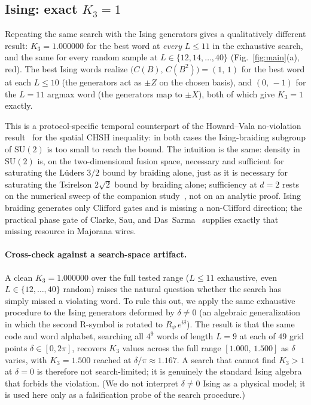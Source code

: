 \documentclass[aps,prx,reprint,amsmath,amssymb,floatfix,nofootinbib,superscriptaddress]{revtex4-2}
\begin{document}
\subsection{Ising: exact $K_{3} = 1$}
\label{sec:ising}

Repeating the same search with the Ising generators gives a
qualitatively different result: $K_{3} = 1.000000$ for the best word
at \emph{every} $L \leq 11$ in the exhaustive search, and the same
for every random sample at $L \in \{12, 14, \ldots, 40\}$
(Fig.~\ref{fig:main}(a), red). The best Ising words realize
$\bigl(C(B),\, C(B^{2})\bigr) = (1,\,1)$ for the best word at each
$L \leq 10$ (the generators act as $\pm Z$ on the chosen basis), and
$(0,\,-1)$ for the $L=11$ argmax word (the generators map to $\pm
X$), both of which give $K_{3} = 1$ exactly.

This is a protocol-specific temporal counterpart of the Howard--Vala no-violation
result~\cite{HowardVala2012} for the spatial CHSH inequality: in both
cases the Ising-braiding subgroup of $\mathrm{SU}(2)$ is too small to
reach the bound. The intuition is the same: density in
$\mathrm{SU}(2)$ is, on the two-dimensional fusion space, necessary and
sufficient for saturating the L\"uders $3/2$ bound by braiding alone, just
as it is necessary for saturating the Tsirelson $2\sqrt{2}$ bound by braiding
alone; sufficiency at $d=2$ rests on the numerical sweep of the
companion study~\cite{Sayim2026SU2k}, not on an analytic proof. Ising braiding
generates only Clifford gates and is missing a non-Clifford
direction; the practical phase gate of Clarke, Sau, and
Das~Sarma~\cite{ClarkeSauDasSarma2016} supplies exactly that missing
resource in Majorana wires.

\paragraph{Cross-check against a search-space artifact.}
A clean $K_{3}=1.000000$ over the full tested range ($L\leq11$
exhaustive, even $L\in\{12,\ldots,40\}$ random) raises the natural
question whether the search has simply missed a violating word. To
rule this out, we apply the same exhaustive procedure to the
Ising generators deformed by $\delta \neq 0$ (an
algebraic generalization in which the second R-symbol is rotated to
$R_{\psi}\,e^{i\delta}$). The result is that the same code and word alphabet, searching all $4^{9}$ words of length $L = 9$ at each of $49$ grid points $\delta \in [0, 2\pi]$, recovers
$K_{3}$ values across the full range $[1.000,\,1.500]$ as $\delta$
varies, with $K_{3} = 1.500$ reached at $\delta/\pi \approx 1.167$.
A search that cannot find $K_{3} > 1$ at $\delta = 0$ is therefore
not search-limited; it is genuinely the standard Ising algebra that
forbids the violation. (We do not interpret $\delta \neq 0$ Ising as
a physical model; it is used here only as a falsification probe of
the search procedure.)
\end{document}
